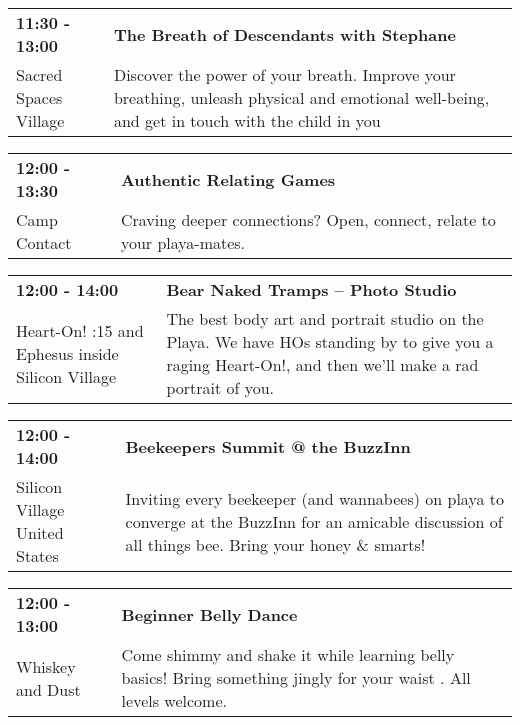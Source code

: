 \begin{tabular}{ p{1in} p{2.2in} }
    \textbf{11:30 - 13:00} & \textbf{The Breath of Descendants with Stephane} \\
    Sacred Spaces Village \newline  & Discover the power of your breath. Improve your breathing, unleash physical and emotional well-being, and get in touch with the child in you \\
    \hline 
\end{tabular}
    
\begin{tabular}{ p{1in} p{2.2in} }
    \textbf{12:00 - 13:30} & \textbf{Authentic Relating Games} \\
    Camp Contact \newline  & Craving deeper connections? Open, connect, relate to your playa-mates. \\
    \hline 
\end{tabular}
    
\begin{tabular}{ p{1in} p{2.2in} }
    \textbf{12:00 - 14:00} & \textbf{Bear Naked Tramps -- Photo Studio} \\
    Heart-On! \newline 6:15 and Ephesus inside Silicon Village & The best body art and portrait studio on the Playa. We have HOs standing by to give you a raging Heart-On!, and then we'll make a rad portrait of you. \\
    \hline 
\end{tabular}
    
\begin{tabular}{ p{1in} p{2.2in} }
    \textbf{12:00 - 14:00} & \textbf{Beekeepers Summit @ the BuzzInn} \\
    Silicon Village \newline United States & Inviting every beekeeper (and wannabees) on playa to converge at the BuzzInn for an amicable discussion of all things bee. Bring your honey \& smarts! \\
    \hline 
\end{tabular}
    
\begin{tabular}{ p{1in} p{2.2in} }
    \textbf{12:00 - 13:00} & \textbf{Beginner Belly Dance} \\
    Whiskey and Dust \newline  & Come shimmy and shake it while learning belly basics! Bring something jingly for your waist . All levels welcome. \\
    \hline 
\end{tabular}
    
